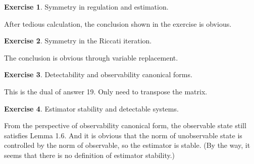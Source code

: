 \documentclass[11pt,a4paper]{report}
\theoremstyle{definition}\newtheorem{exercise}{Exercise}[chapter]
\begin{document}
\begin{exercise}Symmetry in regulation and estimation.\\
\end{exercise}
\begin{answer}
After tedious calculation, the conclusion shown in the exercise is obvious.
\end{answer}


\begin{exercise}Symmetry in the Riccati iteration.\\
\end{exercise}
\begin{answer}
    The conclusion is obvious through variable replacement.
\end{answer}


\begin{exercise}Detectability and observability canonical forms.\\
\end{exercise}
\begin{answer}
This is the dual of answer 19. Only need to transpose the matrix.
\end{answer}


\begin{exercise}Estimator stability and detectable systems.\\
\end{exercise}
\begin{answer}
From the perspective of observability canonical form, the observable state still satisfies Lemma 1.6. And it is obvious that the norm of unobservable state is controlled by the norm of observable, so the estimator is stable. (By the way, it seems that there is no definition of estimator stability.)
\end{answer}
\end{document}
